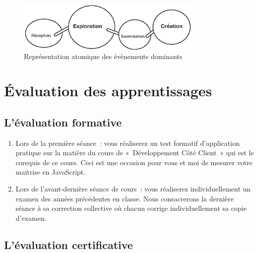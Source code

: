 \begin{figure}[H]
    \begin{center}
        \includegraphics[width=0.8\textwidth]{figures/EAEs.eps}
        \caption{Représentation atomique des évènements dominants \cite{leclercq2008modele}}
    \end{center}
\end{figure}
\clearpage

\section{Évaluation des apprentissages}
\subsection{L’évaluation formative}
\label{eval_formative}
\begin{enumerate}
    \item Lors de la première séance~: vous réaliserez un test formatif d’application pratique sur la matière du cours de «~Développement Côté Client~» qui est le corequis de ce cours. Ceci est une occasion pour vous et moi de mesurer votre maitrise en JavaScript.
    \item Lors de l'avant-dernière séance de cours~: vous réaliserez individuellement un examen des années précédentes en classe. Nous consacrerons la dernière séance à sa correction collective où chacun corrige individuellement sa copie d'examen.
\end{enumerate}

\subsection{L’évaluation certificative}

